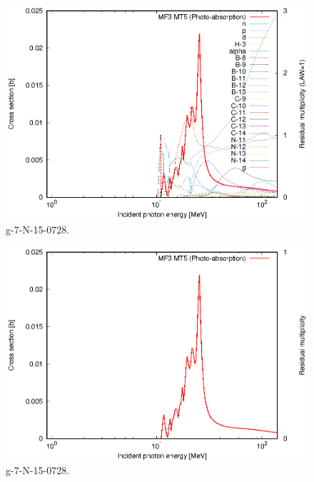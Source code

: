 \begin{figure}
 \includegraphics[width=\linewidth]{eps/g_7-N-15_0728.eps}
  \caption{g-7-N-15-0728.}
\end{figure}
\begin{figure}
 \includegraphics[width=\linewidth]{eps-law0/g_7-N-15_0728.eps}
 \caption{g-7-N-15-0728.}
\end{figure}
\newpage \clearpage

